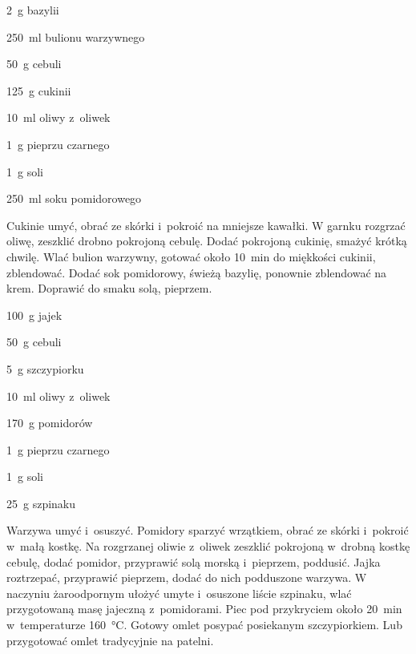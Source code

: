 \documentclass[../kucharek.tex]{subfiles}
\begin{document}

\begin{Ingred}
    \item \qty{2}{\gram} bazylii
    \item \qty{250}{\milli\litre} bulionu warzywnego
    \item \qty{50}{\gram} cebuli
    \item \qty{125}{\gram} cukinii
    \item \qty{10}{\milli\litre} oliwy z~oliwek
    \item \qty{1}{\gram} pieprzu czarnego
    \item \qty{1}{\gram} soli
    \item \qty{250}{\milli\litre} soku pomidorowego
\end{Ingred}

Cukinie umyć, obrać ze skórki i~pokroić na mniejsze kawałki. W garnku rozgrzać
oliwę, zeszklić drobno pokrojoną cebulę. Dodać pokrojoną cukinię, smażyć krótką
chwilę. Wlać bulion warzywny, gotować około \qty{10}{\minute} do miękkości
cukinii, zblendować. Dodać sok pomidorowy, świeżą bazylię, ponownie zblendować
na krem. Doprawić do smaku solą, pieprzem.


\begin{Ingred}
    \item \qty{100}{\gram} jajek
    \item \qty{50}{\gram} cebuli
    \item \qty{5}{\gram} szczypiorku
    \item \qty{10}{\milli\litre} oliwy z~oliwek
    \item \qty{170}{\gram} pomidorów
    \item \qty{1}{\gram} pieprzu czarnego
    \item \qty{1}{\gram} soli
    \item \qty{25}{\gram} szpinaku
\end{Ingred}

Warzywa umyć i~osuszyć. Pomidory sparzyć wrzątkiem, obrać ze skórki i~pokroić
w~małą kostkę. Na rozgrzanej oliwie z~oliwek zeszklić pokrojoną w~drobną kostkę
cebulę, dodać pomidor, przyprawić solą morską i~pieprzem, poddusić. Jajka
roztrzepać, przyprawić pieprzem, dodać do nich podduszone warzywa. W naczyniu
żaroodpornym ułożyć umyte i~osuszone liście szpinaku, wlać przygotowaną masę
jajeczną z~pomidorami. Piec pod przykryciem około \qty{20}{\minute}
w~temperaturze \qty{160}{\celsius}. Gotowy omlet posypać posiekanym
szczypiorkiem. Lub przygotować omlet tradycyjnie na patelni.
\end{document}
